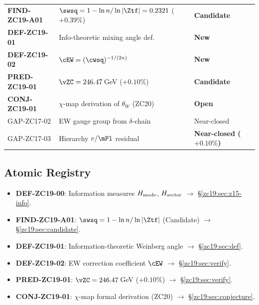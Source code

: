 \documentclass[12pt, a4paper]{article}
\begin{document}
\begin{formalbox}[title={Z-Programme Status after TASK-ZC19}]
{\begin{longtable}{>{\raggedright\arraybackslash}p{3.6cm}
                  >{\raggedright\arraybackslash}p{5.8cm}
                  >{\centering\arraybackslash}p{2.4cm}}
\textbf{FIND-ZC19-A01} & $\swsq = 1 - \ln n/\ln|\Ztf| = 0.2321$
  ($+0.39\%$) & \textbf{Candidate} \\
\textbf{DEF-ZC19-01} & Info-theoretic mixing angle def. & \textbf{New} \\
\textbf{DEF-ZC19-02} & $\cEW = (\cwsq)^{-1/(2n)}$ & \textbf{New} \\
\textbf{PRED-ZC19-01} & $\vZC = 246.47$\,GeV ($+0.10\%$) & \textbf{Candidate} \\
\textbf{CONJ-ZC19-01} & $\chi$-map derivation of $\theta_W$
  (ZC20) & \textbf{Open} \\
\midrule
GAP-ZC17-02        & EW gauge group from $\delta$-chain & Near-closed \\
GAP-ZC17-03        & Hierarchy $v/\mPl$ residual & \textbf{Near-closed ($+0.10\%$)} \\
\end{longtable}
}
\end{formalbox}

\subsection{Atomic Registry}
\label{zc19:sec:registry}

\begin{formalbox}[title={Atomic Units Introduced by TASK-ZC19 (5 new units)}]
\begin{itemize}[leftmargin=*, noitemsep]
  \item \textbf{DEF-ZC19-00}: Information measures $H_{\rm mode}$,
    $H_{\rm sector}$ $\to$ \S\ref{zc19:sec:z15-info}.
  \item \textbf{FIND-ZC19-A01}: $\swsq = 1 - \ln n/\ln|\Ztf|$
    (Candidate) $\to$ \S\ref{zc19:sec:candidate}.
  \item \textbf{DEF-ZC19-01}: Information-theoretic Weinberg angle
    $\to$ \S\ref{zc19:sec:def}.
  \item \textbf{DEF-ZC19-02}: EW correction coefficient $\cEW$
    $\to$ \S\ref{zc19:sec:verify}.
  \item \textbf{PRED-ZC19-01}: $\vZC = 246.47$\,GeV ($+0.10\%$)
    $\to$ \S\ref{zc19:sec:verify}.
  \item \textbf{CONJ-ZC19-01}: $\chi$-map formal derivation (ZC20)
    $\to$ \S\ref{zc19:sec:conjecture}.
\end{itemize}
\end{formalbox}
\end{document}
